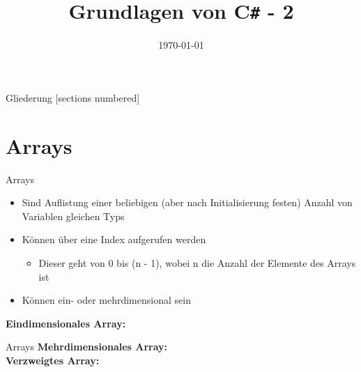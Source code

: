 



\title{Grundlagen von C\texttt{\#} - 2}
\date{\today}




\maketitle

\begin{frame}{Gliederung}
	[sections numbered]
	\tableofcontents
\end{frame}

\section{Arrays}
\begin{frame}{Arrays}
	\begin{itemize}
		\item Sind Auflistung einer beliebigen (aber nach Initialisierung festen) Anzahl von Variablen gleichen Typs
		\item Können über eine Index aufgerufen werden
		\begin{itemize}
			\item Dieser geht von 0 bis (n - 1), wobei n die Anzahl der Elemente des Arrays ist
		\end{itemize}
		\item Können ein- oder mehrdimensional sein
	\end{itemize}
	\textbf{Eindimensionales Array:}\\
		
\end{frame}

\begin{frame}{Arrays}
	\textbf{Mehrdimensionales Array:}\\
		
	\textbf{Verzweigtes Array:}\\
	
\end{frame}

